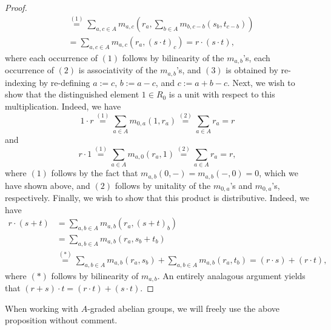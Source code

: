 \documentclass[../main.tex]{subfiles}
\begin{document}
\begin{proof}
\begin{align*}
		&\overset{(1)}=\sum_{a,c\in A}m_{a,c}\left(r_a,\sum_{b\in A}m_{b,c-b}(s_b,t_{c-b})\right) \\
		&=\sum_{a,c\in A}m_{a,c}(r_a,(s\cdot t)_c)=r\cdot(s\cdot t),
	\end{align*}
	where each occurrence of $(1)$ follows by bilinearity of the $m_{a,b}$'s, each occurrence of $(2)$ is associativity of the $m_{a,b}$'s, and $(3)$ is obtained by re-indexing by re-defining $a:=c$, $b:=a-c$, and $c:=a+b-c$. Next, we wish to show that the distinguished element $1\in R_0$ is a unit with respect to this multiplication. Indeed, we have
	\[1\cdot r\overset{(1)}=\sum_{a\in A}m_{0,a}(1,r_a)\overset{(2)}=\sum_{a\in A}r_a=r\]
	and
	\[r\cdot 1\overset{(1)}=\sum_{a\in A}m_{a,0}(r_a,1)\overset{(2)}=\sum_{a\in A}r_a=r,\]
	where $(1)$ follows by the fact that $m_{a,b}(0,-)=m_{a,b}(-,0)=0$, which we have shown above, and $(2)$ follows by unitality of the $m_{0,a}$'s and $m_{0,a}$'s, respectively. Finally, we wish to show that this product is distributive. Indeed, we have
	\begin{align*}
		r\cdot(s+t)&=\sum_{a,b\in A}m_{a,b}(r_a,(s+t)_b) \\
		&=\sum_{a,b\in A}m_{a,b}(r_a,s_b+t_b) \\
		&\overset{(*)}=\sum_{a,b\in A}m_{a,b}(r_a,s_b)+\sum_{a,b\in A}m_{a,b}(r_a,t_b)=(r\cdot s)+(r\cdot t),
	\end{align*}
	where $(*)$ follows by bilinearity of $m_{a,b}$. An entirely analagous argument yields that $(r+s)\cdot t=(r\cdot t)+(s\cdot t)$.
\end{proof}

When working with $A$-graded abelian groups, we will freely use the above proposition without comment. 
\end{document}
